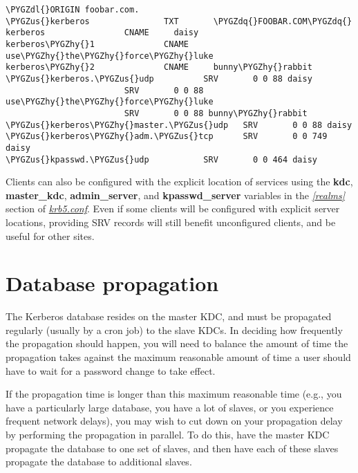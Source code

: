 \documentclass[letterpaper,10pt,english]{sphinxmanual}
\def\PYGZus{\char`\_}
\def\PYGZdl{\char`\$}
\def\PYGZhy{\char`\-}
\def\PYGZdq{\char`\"}
\begin{document}
\begin{Verbatim}[commandchars=\\\{\}]
\PYGZdl{}ORIGIN foobar.com.
\PYGZus{}kerberos               TXT       \PYGZdq{}FOOBAR.COM\PYGZdq{}
kerberos                CNAME     daisy
kerberos\PYGZhy{}1              CNAME     use\PYGZhy{}the\PYGZhy{}force\PYGZhy{}luke
kerberos\PYGZhy{}2              CNAME     bunny\PYGZhy{}rabbit
\PYGZus{}kerberos.\PYGZus{}udp          SRV       0 0 88 daisy
                        SRV       0 0 88 use\PYGZhy{}the\PYGZhy{}force\PYGZhy{}luke
                        SRV       0 0 88 bunny\PYGZhy{}rabbit
\PYGZus{}kerberos\PYGZhy{}master.\PYGZus{}udp   SRV       0 0 88 daisy
\PYGZus{}kerberos\PYGZhy{}adm.\PYGZus{}tcp      SRV       0 0 749 daisy
\PYGZus{}kpasswd.\PYGZus{}udp           SRV       0 0 464 daisy
\end{Verbatim}

Clients can also be configured with the explicit location of services
using the \textbf{kdc}, \textbf{master\_kdc}, \textbf{admin\_server}, and
\textbf{kpasswd\_server} variables in the {\hyperref[admin/conf_files/krb5_conf:realms]{\emph{{[}realms{]}}}} section of
{\hyperref[admin/conf_files/krb5_conf:krb5-conf-5]{\emph{krb5.conf}}}.  Even if some clients will be configured with
explicit server locations, providing SRV records will still benefit
unconfigured clients, and be useful for other sites.


\section{Database propagation}
\label{admin/realm_config:database-propagation}\label{admin/realm_config:db-prop}
The Kerberos database resides on the master KDC, and must be
propagated regularly (usually by a cron job) to the slave KDCs.  In
deciding how frequently the propagation should happen, you will need
to balance the amount of time the propagation takes against the
maximum reasonable amount of time a user should have to wait for a
password change to take effect.

If the propagation time is longer than this maximum reasonable time
(e.g., you have a particularly large database, you have a lot of
slaves, or you experience frequent network delays), you may wish to
cut down on your propagation delay by performing the propagation in
parallel.  To do this, have the master KDC propagate the database to
one set of slaves, and then have each of these slaves propagate the
database to additional slaves.
\end{document}
